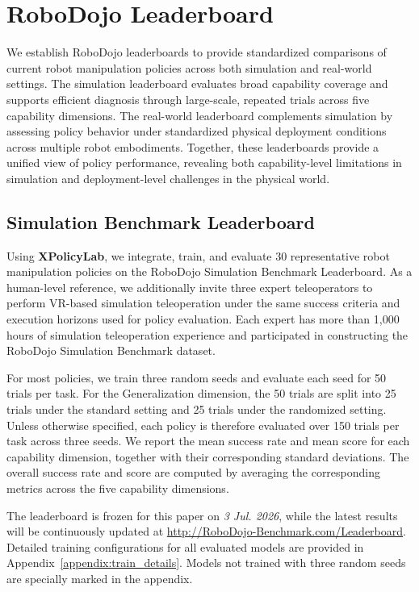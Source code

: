 \section{RoboDojo Leaderboard}
\label{sec:leaderboard}

We establish RoboDojo leaderboards to provide standardized comparisons of current robot manipulation policies across both simulation and real-world settings. The simulation leaderboard evaluates broad capability coverage and supports efficient diagnosis through large-scale, repeated trials across five capability dimensions. The real-world leaderboard complements simulation by assessing policy behavior under standardized physical deployment conditions across multiple robot embodiments. Together, these leaderboards provide a unified view of policy performance, revealing both capability-level limitations in simulation and deployment-level challenges in the physical world.

\subsection{Simulation Benchmark Leaderboard}
\label{sec:sim_leaderboard}

Using \textbf{XPolicyLab}, we integrate, train, and evaluate 30 representative robot manipulation policies on the RoboDojo Simulation Benchmark Leaderboard. As a human-level reference, we additionally invite three expert teleoperators to perform VR-based simulation teleoperation under the same success criteria and execution horizons used for policy evaluation. Each expert has more than 1,000 hours of simulation teleoperation experience and participated in constructing the RoboDojo Simulation Benchmark dataset.

For most policies, we train three random seeds and evaluate each seed for 50 trials per task. For the Generalization dimension, the 50 trials are split into 25 trials under the standard setting and 25 trials under the randomized setting. Unless otherwise specified, each policy is therefore evaluated over 150 trials per task across three seeds. We report the mean success rate and mean score for each capability dimension, together with their corresponding standard deviations. The overall success rate and score are computed by averaging the corresponding metrics across the five capability dimensions.

The leaderboard is frozen for this paper on \textit{3 Jul. 2026}, while the latest results will be continuously updated at \href{http://RoboDojo-Benchmark.com/Leaderboard}{http://RoboDojo-Benchmark.com/Leaderboard}. Detailed training configurations for all evaluated models are provided in Appendix~\ref{appendix:train_details}. Models not trained with three random seeds are specially marked in the appendix.

